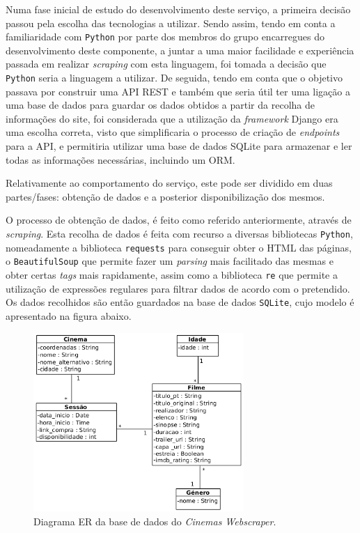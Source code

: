 \documentclass[11pt,a4paper]{article}
\begin{document}
Numa fase inicial de estudo do desenvolvimento deste serviço, a primeira decisão passou pela escolha das
tecnologias a utilizar. Sendo assim, tendo em conta a familiaridade com \texttt{Python} por parte dos
membros do grupo encarregues do desenvolvimento deste componente, a juntar a uma maior facilidade e
experiência passada em realizar \emph{scraping} com esta linguagem, foi tomada a decisão que \texttt{Python}
seria a linguagem a utilizar. De seguida, tendo em conta que o objetivo passava por construir uma API REST e
também que seria útil ter uma ligação a uma base de dados para guardar os dados obtidos a partir da recolha
de informações do site, foi considerada que a utilização da \emph{framework} Django era uma escolha correta,
visto que simplificaria o processo de criação de \emph{endpoints} para a API, e permitiria utilizar uma base
de dados SQLite para armazenar e ler todas as informações necessárias, incluindo um ORM.

\vspace{2mm}

Relativamente ao comportamento do serviço, este pode ser dividido em duas partes/fases: obtenção de dados 
e a posterior disponibilização dos mesmos.

O processo de obtenção de dados, é feito como referido anteriormente, através de \emph{scraping}. Esta
recolha de dados é feita com recurso a diversas bibliotecas \texttt{Python}, nomeadamente a biblioteca
\texttt{requests} para conseguir obter o HTML das páginas, o \texttt{BeautifulSoup} que permite fazer um
\emph{parsing} mais facilitado das mesmas e obter certas \emph{tags} mais rapidamente, assim como a
biblioteca \texttt{re} que permite a utilização de expressões regulares para filtrar dados de
acordo com o pretendido. Os dados recolhidos são então guardados na base de dados \texttt{SQLite}, cujo
modelo é apresentado na figura abaixo.

\begin{figure}[H]
  \centering
  \includegraphics[width=8cm]{images/Cinemas_NOS_DB.png}
  \caption{Diagrama ER da base de dados do \textit{Cinemas Webscraper}.}
  \label{fig:cinemas_er_diagram}
\end{figure}
\end{document}

